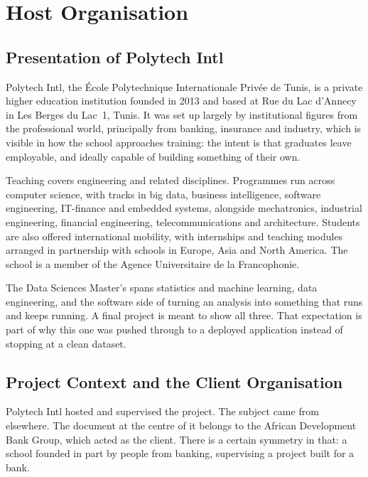 \section{Host Organisation}

\subsection{Presentation of Polytech Intl}

Polytech Intl, the \'Ecole Polytechnique Internationale Priv\'ee de Tunis, is a
private higher education institution founded in 2013 and based at Rue du Lac
d'Annecy in Les Berges du Lac~1, Tunis. It was set up largely by institutional
figures from the professional world, principally from banking, insurance and
industry, which is visible in how the school approaches training: the intent is
that graduates leave employable, and ideally capable of building something of
their own.

Teaching covers engineering and related disciplines. Programmes run across
computer science, with tracks in big data, business intelligence, software
engineering, IT-finance and embedded systems, alongside mechatronics, industrial
engineering, financial engineering, telecommunications and architecture.
Students are also offered international mobility, with internships and teaching
modules arranged in partnership with schools in Europe, Asia and North America.
The school is a member of the Agence Universitaire de la Francophonie.


The Data Sciences Master's spans statistics and machine learning, data
engineering, and the software side of turning an analysis into something that
runs and keeps running. A final project is meant to show all three. That
expectation is part of why this one was pushed through to a deployed application
instead of stopping at a clean dataset.

\subsection{Project Context and the Client Organisation}

Polytech Intl hosted and supervised the project. The subject came from elsewhere.
The document at the centre of it belongs to the African Development Bank Group,
which acted as the client. There is a certain symmetry in that: a school founded
in part by people from banking, supervising a project built for a bank.

